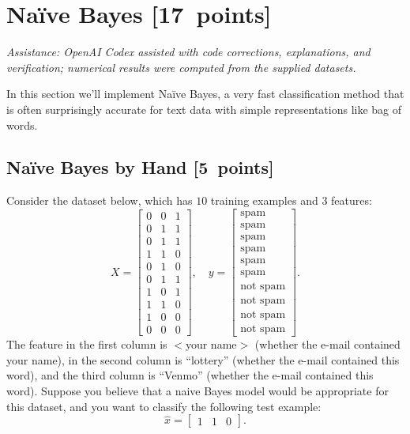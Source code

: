 \documentclass{article}
\newcommand\pts[1]{\textcolor{pointscolour}{[#1~points]}}
\begin{document}
    \clearpage
    \section{Na\"ive Bayes \pts{17}}
    {\small\textit{Assistance: OpenAI Codex assisted with code corrections, explanations, and verification; numerical results were computed from the supplied datasets.}}

    In this section we'll implement Na\"ive Bayes, a very fast classification method that is often surprisingly accurate for text data with simple representations like bag of words.


    \subsection{Na\"ive Bayes by Hand \pts{5}}

    Consider the dataset below, which has $10$ training examples and $3$ features:
    \[
    X = \begin{bmatrix}
        0 & 0 & 1\\
        0 & 1 & 1\\
        0 & 1 & 1\\
        1 & 1 & 0\\
        0 & 1 & 0\\
        0 & 1 & 1\\
        1 & 0 & 1\\
        1 & 1 & 0\\
        1 & 0 & 0\\
        0 & 0 & 0
    \end{bmatrix},
    \quad y = \begin{bmatrix}
        \text{spam}\\
        \text{spam}\\
        \text{spam}\\
        \text{spam}\\
        \text{spam}\\
        \text{spam}\\
        \text{not spam}\\
        \text{not spam}\\
        \text{not spam}\\
        \text{not spam}
    \end{bmatrix}.
    \]
    The feature in the first column is $<$your name$>$ (whether the e-mail contained your name), in the second column is ``lottery'' (whether the e-mail contained this word), and the third column is ``Venmo'' (whether the e-mail contained this word).
    Suppose you believe that a naive Bayes model would be appropriate for this dataset, and you want to classify the following test example:
    \[
    \hat{x} = \begin{bmatrix}1 & 1 & 0\end{bmatrix}.
    \]
\end{document}
